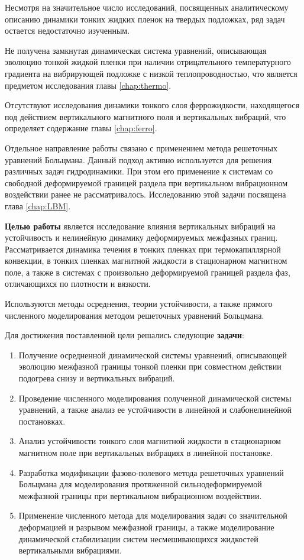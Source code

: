 \documentclass[12pt,a4paper]{article}
\begin{document}
Несмотря на значительное число исследований, посвященных аналитическому описанию динамики тонких жидких пленок на твердых подложках, ряд задач остается недостаточно изученным. 

Не получена замкнутая динамическая система уравнений, описывающая эволюцию тонкой жидкой пленки при наличии отрицательного температурного градиента на вибрирующей подложке с низкой теплопроводностью, что является предметом исследования главы \ref{chap:thermo}.

Отсутствуют исследования динамики тонкого слоя феррожидкости, находящегося под действием вертикального магнитного поля и вертикальных вибраций, что определяет содержание главы \ref{chap:ferro}.

Отдельное направление работы связано с применением метода решеточных уравнений Больцмана. Данный подход активно используется для решения различных задач гидродинамики. При этом его применение к системам со свободной деформируемой границей раздела при вертикальном вибрационном воздействии ранее не рассматривалось. Исследованию этой задачи посвящена глава \ref{chap:LBM}.

\textbf{Целью работы} является исследование влияния вертикальных вибраций на устойчивость и нелинейную динамику деформируемых межфазных границ. Рассматривается динамика течения в тонких пленках при термокапиллярной конвекции, в тонких пленках магнитной жидкости в стационарном магнитном поле, а также в системах с произвольно деформируемой границей раздела фаз, отличающихся по плотности и вязкости. 

Используются методы осреднения, теории устойчивости, а также прямого численного моделирования методом решеточных уравнений Больцмана.

Для достижения поставленной цели решались следующие \textbf{задачи}:
\begin{enumerate}
	\item Получение осредненной динамической системы уравнений, описывающей эволюцию межфазной границы тонкой пленки при совместном действии подогрева снизу и вертикальных вибраций. 
	
	\item Проведение численного моделирования полученной динамической системы уравнений, а также анализ ее устойчивости в линейной и слабонелинейной постановках.
	\item Анализ устойчивости тонкого слоя магнитной жидкости в стационарном магнитном поле при вертикальных вибрациях в линейной постановке.
	\item Разработка модификации фазово-полевого метода решеточных уравнений Больцмана для моделирования протяженной сильнодеформируемой межфазной границы при вертикальном вибрационном воздействии.
	\item Применение численного метода для моделирования задач со значительной деформацией и разрывом межфазной границы, а также моделирование динамической стабилизации систем несмешивающихся жидкостей вертикальными вибрациями.
\end{enumerate}
\end{document}
